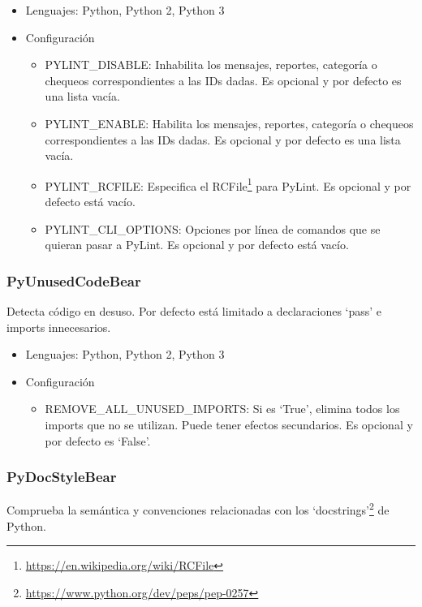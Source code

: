 \documentclass[a4paper, 12pt]{book}
\begin{document}
\begin{itemize}
  \item Lenguajes: Python, Python 2, Python 3
  \item Configuración
    \begin{itemize}
          \item PYLINT\_DISABLE: Inhabilita los mensajes, reportes, categoría o chequeos correspondientes a las IDs dadas. Es opcional y por defecto es una lista vacía.
          \item PYLINT\_ENABLE: Habilita los mensajes, reportes, categoría o chequeos correspondientes a las IDs dadas. Es opcional y por defecto es una lista vacía.
          \item PYLINT\_RCFILE: Especifica el RCFile\footnote{\url{https://en.wikipedia.org/wiki/RCFile}} para PyLint. Es opcional y por defecto está vacío.
          \item PYLINT\_CLI\_OPTIONS: Opciones por línea de comandos que se quieran pasar a PyLint. Es opcional y por defecto está vacío.
    \end{itemize}
\end{itemize}

\subsubsection{PyUnusedCodeBear}
\label{sec:seccion1.2.11}
Detecta código en desuso. Por defecto está limitado a declaraciones `pass' e imports innecesarios.

\begin{itemize}
  \item Lenguajes: Python, Python 2, Python 3
  \item Configuración
    \begin{itemize}
          \item REMOVE\_ALL\_UNUSED\_IMPORTS: Si es `True', elimina todos los imports que no se utilizan. Puede tener efectos secundarios. Es opcional y por defecto es `False'.
    \end{itemize}
\end{itemize}

\subsubsection{PyDocStyleBear}
\label{sec:seccion1.2.12}
Comprueba la semántica y convenciones relacionadas con los `docstrings'\footnote{\url{https://www.python.org/dev/peps/pep-0257}} de Python.
\end{document}
